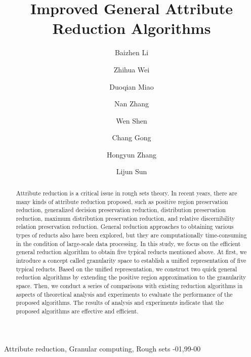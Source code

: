 \documentclass[review]{elsarticle}
\begin{document}
\begin{frontmatter}
\title{Improved General Attribute Reduction Algorithms}
\author[mymainaddress]{Baizhen Li}
\author[mymainaddress]{Zhihua Wei}
\author[mymainaddress]{Duoqian Miao}
\author[mysecondaryaddress]{Nan Zhang}
\author[mymainaddress]{Wen Shen}
\author[mymainaddress]{Chang Gong}
\author[mymainaddress]{Hongyun Zhang}
\author[mymainaddress]{Lijun Sun}
\address[mymainaddress]{Tongji University, Shanghai 201804, PR China}
\address[mysecondaryaddress]{Yantai University, Yantai, Shandong 264005, PR China}

\begin{abstract}
Attribute reduction is a critical issue in rough sets theory. In recent years, there are many kinds of attribute reduction proposed, such as positive region preservation reduction, generalized decision preservation reduction, distribution preservation reduction, maximum distribution preservation reduction, and relative discernibility relation preservation reduction. General reduction approaches to obtaining various types of reducts also have been explored, but they are  computationally time-consuming in the condition of large-scale data processing. In this study, we focus on the efficient general reduction algorithm to obtain five typical reducts mentioned above. At first, we introduce a concept called granularity space to establish a unified representation of five typical reducts. Based on the unified representation, we construct two quick general reduction algorithms by extending the positive region approximation to the granularity space. Then, we conduct a series of comparisons with existing reduction algorithms in aspects of theoretical analysis and experiments to evaluate the performance of the proposed algorithms. The results of analysis and experiments indicate that the proposed algorithms are effective and efficient.
\end{abstract}

\begin{keyword}
Attribute reduction, Granular computing, Rough sets
-01\sep  99-00
\end{keyword}
\end{frontmatter}
\end{document}
